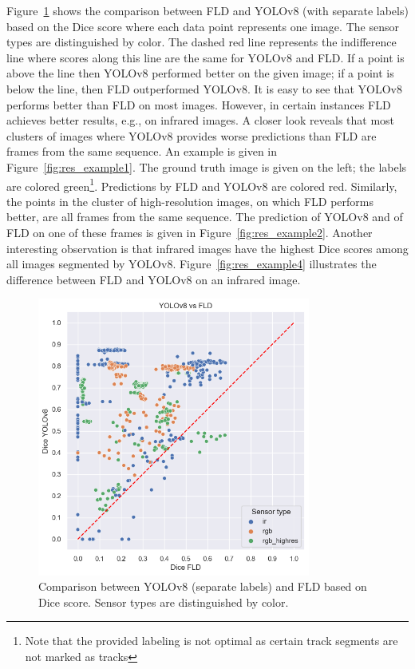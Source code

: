 \documentclass[Master,MDS,english]{BASE/twbook} %
\begin{document}
Figure~\ref{fig:yolo_vs_fld} shows the comparison between FLD and YOLOv8 (with separate labels) based on the Dice score where each data point represents one image. The sensor types are distinguished by color. The dashed red line represents the indifference line where scores along this line are the same for YOLOv8 and FLD. If a point is above the line then YOLOv8 performed better on the given image; if a point is below the line, then FLD outperformed YOLOv8. It is easy to see that YOLOv8 performs better than FLD on most images. However, in certain instances FLD achieves better results, e.g., on infrared images. A closer look reveals that most clusters of images where YOLOv8 provides worse predictions than FLD are frames from the same sequence. 
An example is given in Figure~\ref{fig:res_example1}. The ground truth image is given on the left; the labels are colored green\footnote{Note that the provided labeling is not optimal as certain track segments are not marked as tracks}. Predictions by FLD and YOLOv8 are colored red. 
Similarly, the points in the cluster of high-resolution images, on which FLD performs better, are all frames from the same sequence. The prediction of YOLOv8 and of FLD on one of these frames is given in Figure~\ref{fig:res_example2}.
Another interesting observation is that infrared images have the highest Dice scores among all images segmented by YOLOv8. Figure~\ref{fig:res_example4} illustrates the difference between FLD and YOLOv8 on an infrared image.



\begin{figure}[H]
\centering
\includegraphics[width=0.8\textwidth]{images/results/dice_fld_vs_yolo_nl}
\caption{Comparison between YOLOv8 (separate labels) and FLD based on Dice score. Sensor types are distinguished by color. }
\label{fig:yolo_vs_fld}
\end{figure}
\end{document}
